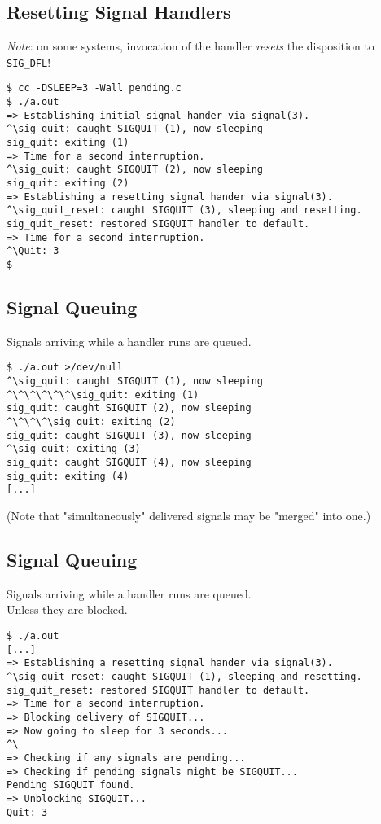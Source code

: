 \documentclass[xga]{xdvislides}
\begin{document}
\subsection{Resetting Signal Handlers}
{\em Note}: on some systems, invocation of the handler {\em resets} the
disposition to {\tt SIG\_DFL}!

\begin{verbatim}
$ cc -DSLEEP=3 -Wall pending.c
$ ./a.out
=> Establishing initial signal hander via signal(3).
^\sig_quit: caught SIGQUIT (1), now sleeping
sig_quit: exiting (1)
=> Time for a second interruption.
^\sig_quit: caught SIGQUIT (2), now sleeping
sig_quit: exiting (2)
=> Establishing a resetting signal hander via signal(3).
^\sig_quit_reset: caught SIGQUIT (3), sleeping and resetting.
sig_quit_reset: restored SIGQUIT handler to default.
=> Time for a second interruption.
^\Quit: 3
$
\end{verbatim}

\subsection{Signal Queuing}
Signals arriving while a handler runs are queued.
\begin{verbatim}
$ ./a.out >/dev/null
^\sig_quit: caught SIGQUIT (1), now sleeping
^\^\^\^\^\^\sig_quit: exiting (1)
sig_quit: caught SIGQUIT (2), now sleeping
^\^\^\^\sig_quit: exiting (2)
sig_quit: caught SIGQUIT (3), now sleeping
^\sig_quit: exiting (3)
sig_quit: caught SIGQUIT (4), now sleeping
sig_quit: exiting (4)
[...]
\end{verbatim}

(Note that "simultaneously" delivered signals may be "merged" into one.)

\subsection{Signal Queuing}
Signals arriving while a handler runs are queued. \\
Unless they are blocked.

\begin{verbatim}
$ ./a.out
[...]
=> Establishing a resetting signal hander via signal(3).
^\sig_quit_reset: caught SIGQUIT (1), sleeping and resetting.
sig_quit_reset: restored SIGQUIT handler to default.
=> Time for a second interruption.
=> Blocking delivery of SIGQUIT...
=> Now going to sleep for 3 seconds...
^\
=> Checking if any signals are pending...
=> Checking if pending signals might be SIGQUIT...
Pending SIGQUIT found.
=> Unblocking SIGQUIT...
Quit: 3
\end{verbatim}
\end{document}
